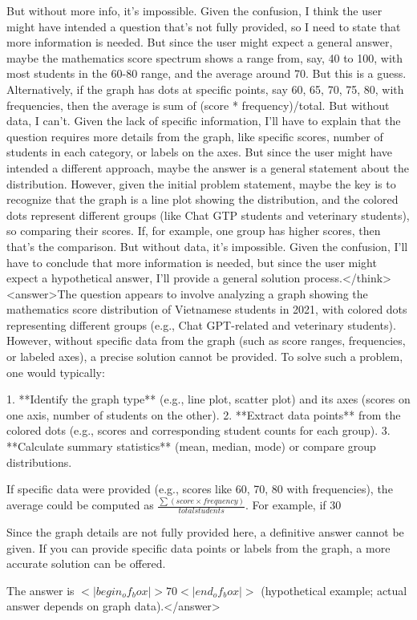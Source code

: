 But without more info, it's impossible. Given the confusion, I think the user might have intended a question that's not fully provided, so I need to state that more information is needed. But since the user might expect a general answer, maybe the mathematics score spectrum shows a range from, say, 40 to 100, with most students in the 60-80 range, and the average around 70. But this is a guess. Alternatively, if the graph has dots at specific points, say 60, 65, 70, 75, 80, with frequencies, then the average is sum of (score * frequency)/total. But without data, I can't. Given the lack of specific information, I'll have to explain that the question requires more details from the graph, like specific scores, number of students in each category, or labels on the axes. But since the user might have intended a different approach, maybe the answer is a general statement about the distribution. However, given the initial problem statement, maybe the key is to recognize that the graph is a line plot showing the distribution, and the colored dots represent different groups (like Chat GTP students and veterinary students), so comparing their scores. If, for example, one group has higher scores, then that's the comparison. But without data, it's impossible. Given the confusion, I'll have to conclude that more information is needed, but since the user might expect a hypothetical answer, I'll provide a general solution process.</think><answer>The question appears to involve analyzing a graph showing the mathematics score distribution of Vietnamese students in 2021, with colored dots representing different groups (e.g., Chat GPT-related and veterinary students). However, without specific data from the graph (such as score ranges, frequencies, or labeled axes), a precise solution cannot be provided. To solve such a problem, one would typically:  

1. **Identify the graph type** (e.g., line plot, scatter plot) and its axes (scores on one axis, number of students on the other).  
2. **Extract data points** from the colored dots (e.g., scores and corresponding student counts for each group).  
3. **Calculate summary statistics** (mean, median, mode) or compare group distributions.  

If specific data were provided (e.g., scores like 60, 70, 80 with frequencies), the average could be computed as \(\frac{\sum (score \times frequency)}{total students}\). For example, if 30%

Since the graph details are not fully provided here, a definitive answer cannot be given. If you can provide specific data points or labels from the graph, a more accurate solution can be offered.  

The answer is \(<|begin_of_box|>70<|end_of_box|>\) (hypothetical example; actual answer depends on graph data).</answer>